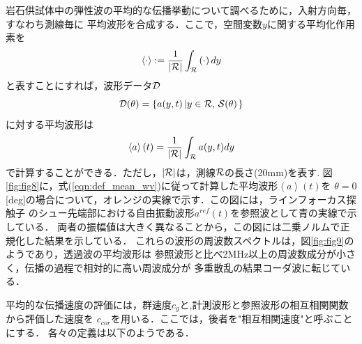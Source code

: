 岩石供試体中の弾性波の平均的な伝播挙動について調べるために，入射方向毎，すなわち測線毎に
平均波形を合成する．ここで，空間変数$y$に関する平均化作用素を
\begin{equation}
	\left< \cdot \right> := 
	\frac{1}{ \left| {\cal R} \right| }\int_{\cal R}\left( \cdot \right)dy
	\label{eqn:averaging}
\end{equation}
と表すことにすれば，波形データ${\cal D}$
\begin{equation}
	{\cal D}(\theta)=\left\{ a(y,t) \left| y\in {\cal R}, \, {\cal S}(\theta)\right.\right\}
	\label{eqn:}
\end{equation}
に対する平均波形は
\begin{equation}
	\left< a\right>(t)=
	\frac{1}{\left| {\cal R}\right|}\int_{\cal R}a(y,t)dy
	\label{eqn:def_mean_wv}
\end{equation}
で計算することができる．ただし，$\left| {\cal R }\right|$は，測線$\cal R$の長さ(20mm)を表す.
図\ref{fig:fig8}に，式(\ref{eqn:def_mean_wv})に従って計算した平均波形$\left<a \right>(t)$を
$\theta=0$[deg]の場合について，オレンジの実線で示す．この図には，ラインフォーカス探触子
のシュー先端部における自由振動波形$a^{ref}(t)$を参照波として青の実線で示している．
両者の振幅値は大きく異なることから，この図には二乗ノルムで正規化した結果を示している．
これらの波形の周波数スペクトルは，図\ref{fig:fig9}のようであり，透過波の平均波形は
参照波形と比べ2MHz以上の周波数成分が小さく，伝播の過程で相対的に高い周波成分が
多重散乱の結果コーダ波に転じている．

平均的な伝播速度の評価には，群速度$c_g$と,計測波形と参照波形の相互相関関数から評価した速度を
$c_{cor}$を用いる．ここでは，後者を"相互相関速度"と呼ぶことにする．
各々の定義は以下のようである．
